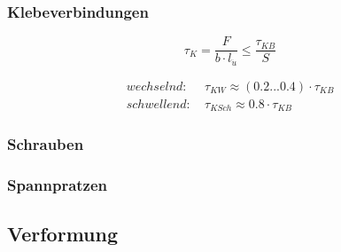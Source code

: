     \subsubsection{Klebeverbindungen}
    \begin{equation}
      \label{Kleben}
      \tau_K = \frac{F}{b \cdot l_{\ddot{u}}} \leq \frac{\tau_{KB}}{S}
    \end{equation}

    \begin{equation}
      \label{Zulässige Schubspannungen}
      \begin{split}
      wechselnd: & \: \tau_{KW} \approx \left (0.2 ... 0.4 \right ) \cdot \tau_{KB}\\
      schwellend: & \: \tau_{KSch} \approx 0.8 \cdot \tau_{KB}
      \end{split}
    \end{equation}

    \subsubsection{Schrauben}

    \subsubsection{Spannpratzen}


  \subsection{Verformung}
